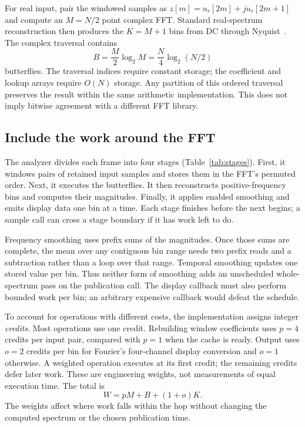 For real input, pair the windowed samples as
$z[m]=u_r[2m]+j u_r[2m+1]$ and compute an $M=N/2$ point complex FFT.
Standard real-spectrum reconstruction then produces the $K=M+1$ bins from
DC through Nyquist~\cite{sorensen1987}. The complex traversal contains
\begin{equation}
 B=\frac{M}{2}\log_2 M=\frac{N}{4}\log_2(N/2)
 \label{eq:butterflies}
\end{equation}
butterflies. The traversal indices require constant storage; the coefficient
and lookup arrays require $O(N)$ storage. Any partition of this ordered
traversal preserves the result within the same arithmetic implementation.
This does not imply bitwise agreement with a different FFT library.

\subsection{Include the work around the FFT}
The analyzer divides each frame into four stages
(Table~\ref{tab:stages}). First, it windows pairs of retained input samples
and stores them in the FFT's permuted order. Next, it executes the
butterflies. It then reconstructs positive-frequency bins and computes their
magnitudes. Finally, it applies enabled smoothing and emits display data one
bin at a time. Each stage finishes before the next begins; a sample call can
cross a stage boundary if it has work left to do.



Frequency smoothing uses prefix sums of the magnitudes. Once those sums are
complete, the mean over any contiguous bin range needs two prefix reads and
a subtraction rather than a loop over that range. Temporal smoothing updates
one stored value per bin. Thus neither form of smoothing adds an unscheduled
whole-spectrum pass on the publication call. The display callback must also
perform bounded work per bin; an arbitrary expensive callback would defeat
the schedule.

To account for operations with different costs, the implementation assigns
integer \emph{credits}. Most operations use one credit. Rebuilding window
coefficients uses $p=4$ credits per input pair, compared with $p=1$ when the
cache is ready. Output uses $o=2$ credits per bin for Fourier's four-channel
display conversion and $o=1$ otherwise. A weighted operation executes at its
first credit; the remaining credits defer later work. These are engineering
weights, not measurements of equal execution time. The total is
\begin{equation}
 W=pM+B+(1+o)K.
 \label{eq:work}
\end{equation}
The weights affect where work falls within the hop without changing the
computed spectrum or the chosen publication time.

